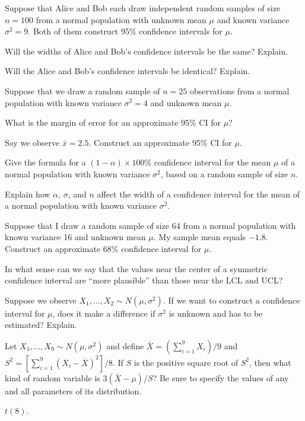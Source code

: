\documentclass[addpoints,12pt]{exam}
\begin{document}
\begin{questions}
\question Suppose that Alice and Bob each draw independent random samples of size $n=100$ from a normal population with unknown mean $\mu$ and known variance $\sigma^2=9$. Both of them construct 95\% confidence intervals for $\mu$. 
\begin{parts}
  \item Will the widths of Alice and Bob's confidence intervals be the same? Explain. 
  \item Will the Alice and Bob's confidence intervals be identical? Explain.
\end{parts}

\question Suppose that we draw a random sample of $n = 25$ observations from a normal population with known variance $\sigma^2 = 4$ and unknown mean $\mu$. 
\begin{parts}
 \item What is the margin of error for an approximate 95\% CI for $\mu$?
 \item Say we observe $\bar{x} = 2.5$. Construct an approximate 95\% CI for $\mu$.
\end{parts}

\question Give the formula for a $(1 - \alpha)\times 100\%$ confidence interval for the mean $\mu$ of a normal population with known variance $\sigma^2$, based on a random sample of size $n$.

\question Explain how $\alpha$, $\sigma$, and $n$ affect the width of a confidence interval for the mean of a normal population with known variance $\sigma^2$.

\question Suppose that I draw a random sample of size 64 from a normal population with known variance 16 and unknown mean $\mu$. My sample mean equals $-1.8$. Construct an approximate 68\% confidence interval for $\mu$.


\question In what sense can we say that the values near the center of a symmetric confidence interval are ``more plausible'' than those near the LCL and UCL?

  \question Suppose we observe $X_1, \dots, X_2 \sim N(\mu, \sigma^2)$. If we want to construct a confidence interval for $\mu$, does it make a difference if $\sigma^2$ is unknown and has to be estimated? Explain.

  \question Let $X_1, \dots, X_{9} \sim N(\mu, \sigma^2)$ and define $\bar{X} = (\sum_{i=1}^9 X_i)/9$ and $S^2 = \left[ \sum_{i=1}^9 (X_i - \bar{X})^2 \right]/8$. If $S$ is the positive square root of $S^2$, then what kind of random variable is $3(\bar{X} - \mu)/S$? Be sure to specify the values of any and all parameters of its distribution.
  \begin{solution}
    $t(8)$.
  \end{solution}


\end{questions}
\end{document}
